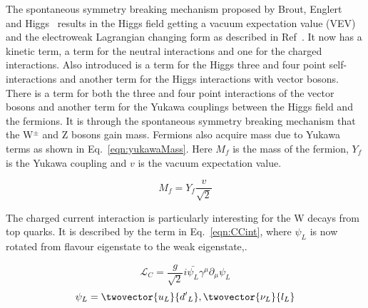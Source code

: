

The spontaneous symmetry breaking mechanism proposed by Brout, Englert~\cite{PhysRevLett.13.321} and Higgs~\cite{PhysRevLett.13.508} results in the Higgs field getting a vacuum expectation value (VEV) and the electroweak Lagrangian changing form as described in Ref~\cite{Pich:2005mk}. It now has a kinetic term, a term for the neutral interactions and one for the charged interactions. Also introduced is a term for the Higgs three and four point self-interactions and another term for the Higgs interactions with vector bosons. There is a term for both the three and four point interactions of the vector bosons and another term for the Yukawa couplings between the Higgs field and the fermions.  It is through the spontaneous symmetry breaking mechanism that the W$^{\pm}$ and Z bosons gain mass. Fermions also acquire mass due to Yukawa terms as shown in Eq.~\ref{eqn:yukawaMass}. Here $M_f$ is the mass of the fermion, $Y_f$ is the Yukawa coupling and $v$ is the vacuum expectation value.

\begin{equation}
M_f = Y_f \frac{v}{\sqrt{2}}
\label{eqn:yukawaMass}
\end{equation}

The charged current interaction is particularly interesting for the W decays from top quarks. It is described by the term in Eq.~\ref{eqn:CCint}, where $\psi_L$ is now rotated from flavour eigenstate to the weak eigenstate,.

\begin{equation}
\label{eqn:CCint}
\mathcal{L}_{C} = \frac{g}{\sqrt{2}} i\bar{\psi_{L}} \gamma^{\mu} \partial_{\mu} \psi_{L}
\end{equation}
\begin{equation*}
\psi_L = \twovector{u_L}{{d'}_L}, \twovector{\nu_L}{l_L}
\end{equation*}

